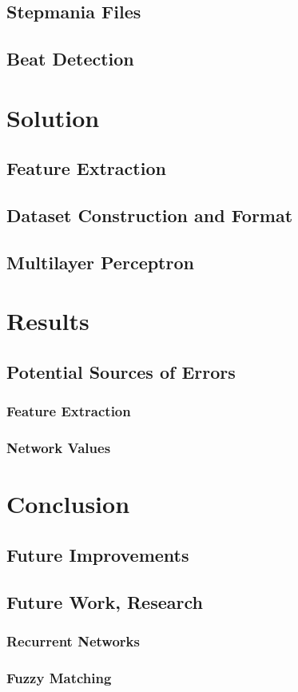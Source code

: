 \documentclass[12pt]{article}
\begin{document}
\subsection{Stepmania Files}



\subsection{Beat Detection}


\section{Solution}


\subsection{Feature Extraction}


\subsection{Dataset Construction and Format}


\subsection{Multilayer Perceptron}

\pagebreak
\section{Results}


\subsection{Potential Sources of Errors}

\subsubsection{Feature Extraction}


\subsubsection{Network Values}
\pagebreak
\section{Conclusion}

\subsection{Future Improvements}


\subsection{Future Work, Research}

\subsubsection{Recurrent Networks}

\subsubsection{Fuzzy Matching}


\pagebreak


\end{document}

